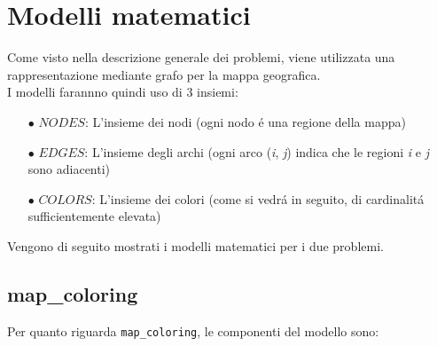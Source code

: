 \documentclass{article}
\begin{document}
\section{Modelli matematici}
Come visto nella descrizione generale dei problemi, viene utilizzata una rappresentazione mediante grafo per la mappa geografica.\\
I modelli farannno quindi uso di 3 insiemi:
\begin{itemize}
	\item[$\bullet$] $NODES$: L'insieme dei nodi (ogni nodo \'e una regione della mappa)\\
	\item[$\bullet$] $EDGES$: L'insieme degli archi (ogni arco (\emph{i}, \emph{j}) indica che le regioni \emph{i} e \emph{j} sono adiacenti)\\
	\item[$\bullet$] $COLORS$: L'insieme dei colori (come si vedr\'a in seguito, di cardinalit\'a sufficientemente elevata)\\
	\end{itemize}
	
Vengono di seguito mostrati i modelli matematici per i due problemi.\\

\subsection{map\_coloring}
Per quanto riguarda \texttt{map\_coloring}, le componenti del modello sono:\\
\end{document}
